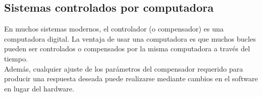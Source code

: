 
\subsection{Sistemas controlados por computadora}
En muchos sistemas modernos, el controlador (o compensador) es una computadora digital. La ventaja
de usar una computadora es que muchos bucles pueden ser controlados o compensados por la misma
computadora a través del tiempo. \cite{Book:Nise2010}\\
Además, cualquier ajuste de los parámetros del compensador requerido para producir una respuesta
deseada puede realizarse mediante cambios en el software en lugar del hardware.